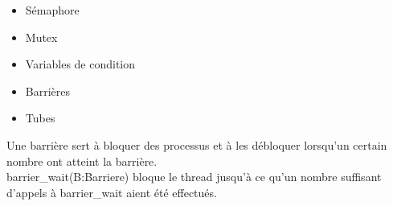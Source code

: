 \begin{itemize}
	\item Sémaphore
	\item Mutex
	\item Variables de condition 
	\item Barrières
	\item Tubes
\end{itemize}

 Une barrière sert à bloquer des processus et à les débloquer lorsqu'un certain nombre ont atteint la barrière. \\

 barrier\_wait(B:Barriere) bloque le thread jusqu'à ce qu'un nombre suffisant d'appels à barrier\_wait aient été effectués. 
